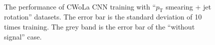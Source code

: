 \documentclass[12pt]{article}
\begin{document}
        \begin{figure}[htpb]
            \centering
             \\
            \caption{The performance of CWoLa CNN training with ``$p_{\text{T}}$ smearing + jet rotation'' datasets. The error bar is the standard deviation of 10 times training. The grey band is the error bar of the ``without signal'' case.}
            \label{fig:acc_auc_curve_origin_pt_jet_aug_1_3_res_25_75}
        \end{figure}
\end{document}
